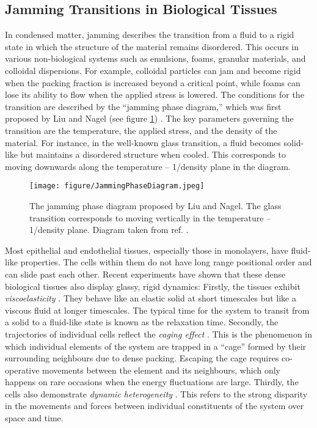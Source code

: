 \documentclass[a4paper,12pt]{article}
\begin{document}
\subsection{Jamming Transitions in Biological Tissues}
\label{sec:jamminginbio}
In condensed matter, jamming describes the transition from a fluid to a rigid state in which the structure of the material remains disordered. This occurs in various non-biological systems such as emulsions, foams, granular materials, and colloidal dispersions\cite{hecke2010}. For example, colloidal particles can jam and become rigid when the packing fraction is increased beyond a critical point, while foams can lose its ability to flow when the applied stress is lowered. The conditions for the transition are described by the ``jamming phase diagram,'' which was first proposed by Liu and Nagel (see figure \ref{fig:JammingPhaseDiagram}) \cite{liu1998}. The key parameters governing the transition are the temperature, the applied stress, and the density of the material. For instance, in the well-known glass transition, a fluid becomes solid-like but maintains a disordered structure when cooled. This corresponds to moving downwards along the temperature -- 1/density plane in the diagram. 

\begin{figure}[h]
\centering
\texttt{[image: figure/JammingPhaseDiagram.jpeg]}
\caption{The jamming phase diagram proposed by Liu and Nagel. The glass transition corresponds to moving vertically in the temperature -- 1/density plane. Diagram taken from ref. \cite{liu2010}.}
\label{fig:JammingPhaseDiagram}
\end{figure}

Most epithelial and endothelial tissues, especially those in monolayers, have fluid-like properties. The cells within them do not have long range positional order and can slide past each other. Recent experiments have shown that these dense biological tissues also display glassy, rigid dynamics: Firstly, the tissues exhibit \emph{viscoelasticity} \cite{schoetz2013}. They behave like an elastic solid at short timescales but like a viscous fluid at longer timescales. The typical time for the system to transit from a solid to a fluid-like state is known as the relaxation time. Secondly, the trajectories of individual cells reflect the \emph{caging effect} \cite{schoetz2013}. This is the phenomenon in which individual elements of the system are trapped in a ``cage'' formed by their surrounding neighbours due to dense packing. Escaping the cage requires co-operative movements between the element and its neighbours, which only happens on rare occasions when the energy fluctuations are large. Thirdly, the cells also demonstrate \emph{dynamic heterogeneity} \cite{angelini2010}. This refers to the strong disparity in the movements and forces between individual constituents of the system over space and time. 
\end{document}
